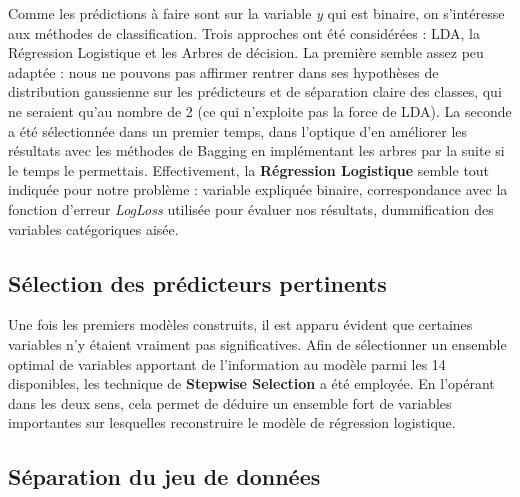 \documentclass[]{article}
\begin{document}
Comme les prédictions à faire sont sur la variable \textit{y} qui est binaire, on s'intéresse aux méthodes de classification. Trois approches ont été considérées : LDA, la Régression Logistique et les Arbres de décision. La première semble assez peu adaptée : nous ne pouvons pas affirmer rentrer dans ses hypothèses de distribution gaussienne sur les prédicteurs et de séparation claire des classes, qui ne seraient qu'au nombre de 2 (ce qui n'exploite pas la force de LDA). La seconde a été sélectionnée dans un premier temps, dans l'optique d'en améliorer les résultats avec les méthodes de Bagging en implémentant les arbres par la suite si le temps le permettais. Effectivement, la \textbf{Régression Logistique} semble tout indiquée pour notre problème : variable expliquée binaire, correspondance avec la fonction d'erreur \textit{LogLoss} utilisée pour évaluer nos résultats, dummification des variables catégoriques aisée.

\subsection{Sélection des prédicteurs pertinents}

Une fois les premiers modèles construits, il est apparu évident que certaines variables n'y étaient vraiment pas significatives. Afin de sélectionner un ensemble optimal de variables apportant de l'information au modèle parmi les 14 disponibles, les technique de \textbf{Stepwise Selection} a été employée. En l'opérant dans les deux sens, cela permet de déduire un ensemble fort de variables importantes sur lesquelles reconstruire le modèle de régression logistique.

\subsection{Séparation du jeu de données}
\end{document}

